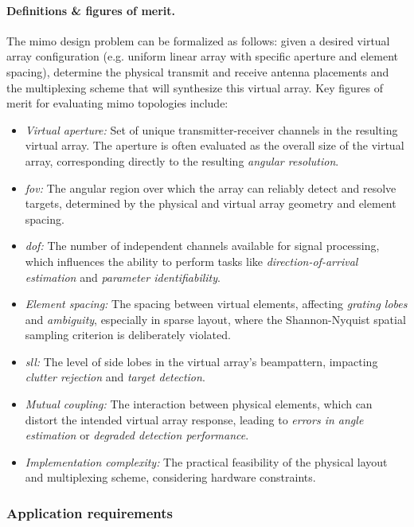 \paragraph{Definitions \& figures of merit.}
The \gls{mimo} design problem can be formalized as follows: given a desired virtual array configuration (e.g. uniform linear array with specific aperture and element spacing), determine the physical transmit and receive antenna placements and the multiplexing scheme that will synthesize this virtual array.
Key figures of merit for evaluating \gls{mimo} topologies include:
\begin{itemize}
    \item \textit{Virtual aperture:} Set of unique transmitter-receiver channels in the resulting virtual array.
    The aperture is often evaluated as the overall size of the virtual array, corresponding directly to the resulting \emph{angular resolution}.
    \item \textit{\Gls{fov}:} The angular region over which the array can reliably detect and resolve targets, determined by the physical and virtual array geometry and element spacing.
    \item \textit{\Gls{dof}:} The number of independent channels available for signal processing, which influences the ability to perform tasks like \emph{direction-of-arrival estimation} and \emph{parameter identifiability}.
    \item \textit{Element spacing:} The spacing between virtual elements, affecting \emph{grating lobes} and \emph{ambiguity}, especially in sparse layout, where the Shannon-Nyquist spatial sampling criterion is deliberately violated.
    \item \textit{\Gls{sll}:} The level of side lobes in the virtual array's beampattern, impacting \emph{clutter rejection} and \emph{target detection}.
    \item \textit{Mutual coupling:} The interaction between physical elements, which can distort the intended virtual array response, leading to \emph{errors in angle estimation} or \emph{degraded detection performance}.
    \item \textit{Implementation complexity:} The practical feasibility of the physical layout and multiplexing scheme, considering hardware constraints.
\end{itemize}


\subsubsection{Application requirements}

